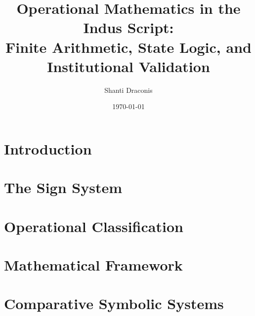 \documentclass[12pt,a4paper]{book}
\title{Operational Mathematics in the Indus Script:\\
Finite Arithmetic, State Logic, and Institutional Validation}
\author{Shanti Draconis}
\date{\today}
\theoremstyle{definition}
\theoremstyle{remark}
\begin{document}
\frontmatter


\tableofcontents
\cleardoublepage


\cleardoublepage


\cleardoublepage

\mainmatter

\chapter{Introduction}




\chapter{The Sign System}





\chapter{Operational Classification}






\chapter{Mathematical Framework}






\chapter{Comparative Symbolic Systems}




\end{document}
